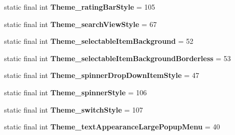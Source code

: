 \begin{DoxyCompactItemize}
\item 
\hypertarget{classandroid_1_1support_1_1design_1_1_r_1_1styleable_a0b61afdbc897102750487923f587da9b}{}static final int {\bfseries Theme\+\_\+rating\+Bar\+Style} = 105\label{classandroid_1_1support_1_1design_1_1_r_1_1styleable_a0b61afdbc897102750487923f587da9b}

\item 
\hypertarget{classandroid_1_1support_1_1design_1_1_r_1_1styleable_a839a954f57b930c9ee93c45ef8e94687}{}static final int {\bfseries Theme\+\_\+search\+View\+Style} = 67\label{classandroid_1_1support_1_1design_1_1_r_1_1styleable_a839a954f57b930c9ee93c45ef8e94687}

\item 
\hypertarget{classandroid_1_1support_1_1design_1_1_r_1_1styleable_a9ceb3c7d29c914da6498642d2e412537}{}static final int {\bfseries Theme\+\_\+selectable\+Item\+Background} = 52\label{classandroid_1_1support_1_1design_1_1_r_1_1styleable_a9ceb3c7d29c914da6498642d2e412537}

\item 
\hypertarget{classandroid_1_1support_1_1design_1_1_r_1_1styleable_a68a6511e442505f597c0857ec777ce7a}{}static final int {\bfseries Theme\+\_\+selectable\+Item\+Background\+Borderless} = 53\label{classandroid_1_1support_1_1design_1_1_r_1_1styleable_a68a6511e442505f597c0857ec777ce7a}

\item 
\hypertarget{classandroid_1_1support_1_1design_1_1_r_1_1styleable_a38ef4bc4081329121c20067f7bb902c9}{}static final int {\bfseries Theme\+\_\+spinner\+Drop\+Down\+Item\+Style} = 47\label{classandroid_1_1support_1_1design_1_1_r_1_1styleable_a38ef4bc4081329121c20067f7bb902c9}

\item 
\hypertarget{classandroid_1_1support_1_1design_1_1_r_1_1styleable_a00b87602bddb7b9f8e2b1fc038728c36}{}static final int {\bfseries Theme\+\_\+spinner\+Style} = 106\label{classandroid_1_1support_1_1design_1_1_r_1_1styleable_a00b87602bddb7b9f8e2b1fc038728c36}

\item 
\hypertarget{classandroid_1_1support_1_1design_1_1_r_1_1styleable_a02f2c793864c9e866f47b5c33f825449}{}static final int {\bfseries Theme\+\_\+switch\+Style} = 107\label{classandroid_1_1support_1_1design_1_1_r_1_1styleable_a02f2c793864c9e866f47b5c33f825449}

\item 
\hypertarget{classandroid_1_1support_1_1design_1_1_r_1_1styleable_a4d5e9bf45e911bae5a967078821103f1}{}static final int {\bfseries Theme\+\_\+text\+Appearance\+Large\+Popup\+Menu} = 40\label{classandroid_1_1support_1_1design_1_1_r_1_1styleable_a4d5e9bf45e911bae5a967078821103f1}


\end{DoxyCompactItemize}
